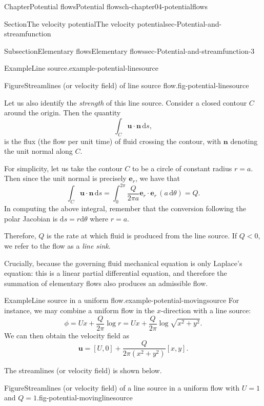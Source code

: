 \documentclass[oneside,10pt,]{book}
\numberwithin{equation}{section}
\newcommand{\de}{\mathrm{d}}
\newcommand{\be}{\boldsymbol{e}}
\newcommand{\bn}{\boldsymbol{n}}
\newcommand{\bu}{\boldsymbol{u}}
\newcommand{\lt}{<}
\begin{document}
\begin{chapterptx}{Chapter}{Potential flows}{}{Potential flows}{}{}{ch-chapter04-potentialflows}
\begin{sectionptx}{Section}{The velocity potential}{}{The velocity potential}{}{}{sec-Potential-and-streamfunction}
\begin{subsectionptx}{Subsection}{Elementary flows}{}{Elementary flows}{}{}{sec-Potential-and-streamfunction-3}
\begin{example}{Example}{Line source.}{example-potential-linesource}
\begin{figureptx}{Figure}{Streamlines (or velocity field) of line source flow.}{fig-potential-linesource}{}
\begin{image}{0.05}{0.9}{0.05}{}
\end{image}%
\tcblower
\end{figureptx}%
Let us also identify the \emph{strength} of this line source. Consider a closed contour \(C\) around the origin. Then the quantity%
\begin{equation*}
\int_C \bu \cdot \bn \, \de{s},
\end{equation*}
is the flux (the flow per unit time) of fluid crossing the contour, with \(\bn\) denoting the unit normal along \(C\).%
\par
For simplicity, let us take the contour \(C\) to be a circle of constant radius \(r = a\). Then since the unit normal is precisely \(\be_r\), we have that%
\begin{equation*}
\int_C \bu \cdot \bn \, \de{s} = \int_0^{2\pi} \frac{Q}{2\pi a} \be_r \cdot \be_r \, (a \, \de\theta) = Q. 
\end{equation*}
In computing the above integral, remember that the conversion following the polar Jacobian is \(\de{s} = r \de{\theta}\) where \(r = a\).%
\par
Therefore, \(Q\) is the rate at which fluid is produced from the line source. If \(Q \lt 0\), we refer to the flow as a \emph{line sink}. %
\end{example}
Crucially, because the governing fluid mechanical equation is only Laplace's equation: this is a linear partial differential equation, and therefore the summation of elementary flows also produces an admissible flow.%
\begin{example}{Example}{Line source in a uniform flow.}{example-potential-movingsource}%
For instance, we may combine a uniform flow in the \(x\)-direction with a line source:%
\begin{equation*}
\phi = Ux + \frac{Q}{2\pi} \log r = Ux + \frac{Q}{2\pi} \log \sqrt{x^2 + y^2}.
\end{equation*}
We can then obtain the velocity field as%
\begin{equation*}
\bu = [U, 0] + \frac{Q}{2\pi(x^2 + y^2)} [x, y].
\end{equation*}
%
\par
The streamlines (or velocity field) is shown below.%
\begin{figureptx}{Figure}{Streamlines (or velocity field) of a line source in a uniform flow with \(U = 1\) and \(Q = 1\).}{fig-potential-movinglinesource}{}%
\begin{image}{0.05}{0.9}{0.05}{}%

\end{image}
\end{figureptx}
\end{example}
\end{subsectionptx}
\end{sectionptx}
\end{chapterptx}
\end{document}
